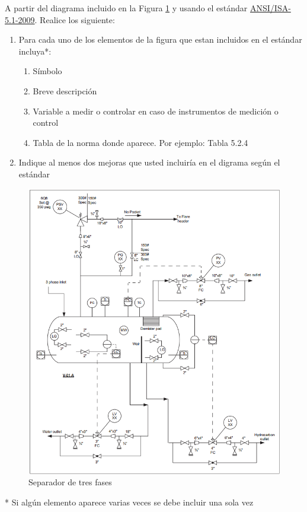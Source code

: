 \documentclass[12pt]{article}
\begin{document}
\setlength{\parindent}{0em}

A partir del diagrama incluido en la Figura \ref{t1f1} y usando el estándar \href{http://integrated.cc/cse/Instrumentation_Symbols_and_Identification.pdf}{ANSI/ISA-5.1-2009}.
Realice los siguiente:
\begin{enumerate}
    \item Para cada uno de los elementos de la figura que estan incluidos en el estándar incluya*: 
    \begin{enumerate}
        \item Símbolo
        \item Breve descripción
        \item Variable a medir o controlar en caso de instrumentos de medición o control
        \item Tabla de la norma donde aparece. Por ejemplo: Tabla 5.2.4        
    \end{enumerate}
    \item Indique al menos dos mejoras que usted incluiría en el digrama según el estándar
\end{enumerate}
\begin{figure}[H]
    \centering
    \includegraphics[width = 0.6\linewidth]{fig/diagrama1.png}
    \caption{Separador de tres fases}
    \label{t1f1}
\end{figure}
* Si algún elemento aparece varias veces se debe incluir una sola vez
\end{document}
